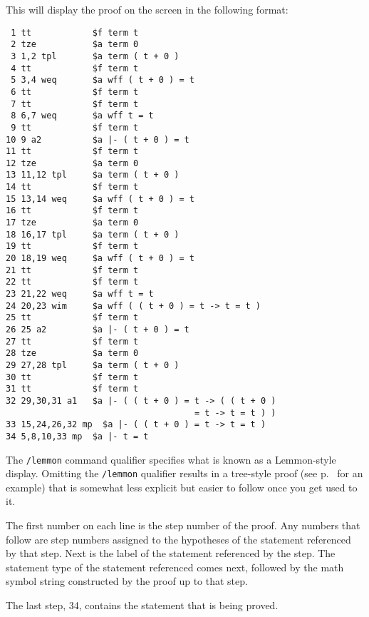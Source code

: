 This will display the proof on the screen in the following format:
\begin{verbatim}
 1 tt            $f term t
 2 tze           $a term 0
 3 1,2 tpl       $a term ( t + 0 )
 4 tt            $f term t
 5 3,4 weq       $a wff ( t + 0 ) = t
 6 tt            $f term t
 7 tt            $f term t
 8 6,7 weq       $a wff t = t
 9 tt            $f term t
10 9 a2          $a |- ( t + 0 ) = t
11 tt            $f term t
12 tze           $a term 0
13 11,12 tpl     $a term ( t + 0 )
14 tt            $f term t
15 13,14 weq     $a wff ( t + 0 ) = t
16 tt            $f term t
17 tze           $a term 0
18 16,17 tpl     $a term ( t + 0 )
19 tt            $f term t
20 18,19 weq     $a wff ( t + 0 ) = t
21 tt            $f term t
22 tt            $f term t
23 21,22 weq     $a wff t = t
24 20,23 wim     $a wff ( ( t + 0 ) = t -> t = t )
25 tt            $f term t
26 25 a2         $a |- ( t + 0 ) = t
27 tt            $f term t
28 tze           $a term 0
29 27,28 tpl     $a term ( t + 0 )
30 tt            $f term t
31 tt            $f term t
32 29,30,31 a1   $a |- ( ( t + 0 ) = t -> ( ( t + 0 )
                                     = t -> t = t ) )
33 15,24,26,32 mp  $a |- ( ( t + 0 ) = t -> t = t )
34 5,8,10,33 mp  $a |- t = t
\end{verbatim}

The \texttt{/lemmon} command qualifier specifies what is known as a Lemmon-style
display.  Omitting the
\texttt{/lemmon} qualifier results in a tree-style proof (see
p.~\pageref{treeproof} for an example) that is somewhat less explicit but
easier to follow once you get used to it.

The first number on each line is the step
number of the proof.  Any numbers that follow are step numbers assigned to the
hypotheses of the statement referenced by that step.  Next is the label of
the statement referenced by the step.  The statement type of the statement
referenced comes next, followed by the math symbol string
constructed by the proof up to that step.

The last step, 34, contains the statement that is being proved.

